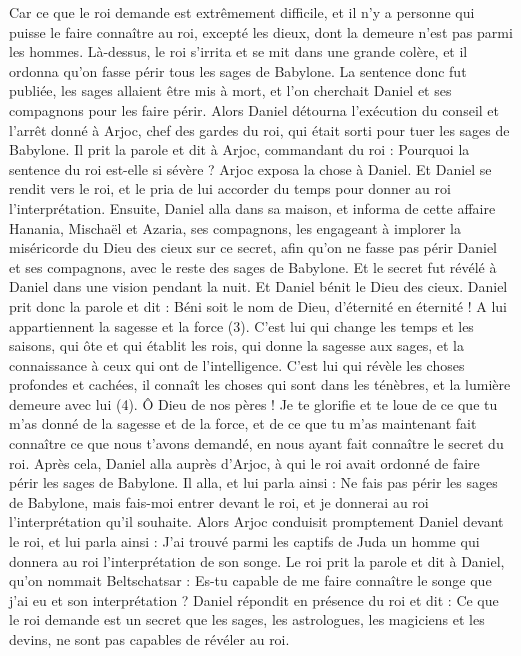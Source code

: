 \begin{multicols}{2}
Car ce que le roi demande est extrêmement difficile, et il n'y a personne qui puisse le faire connaître au roi, excepté les dieux, dont la demeure n’est pas parmi les hommes.
Là-dessus, le roi s’irrita et se mit dans une grande colère, et il ordonna qu’on fasse périr tous les sages de Babylone.
La sentence donc fut publiée, les sages allaient être mis à mort, et l’on cherchait Daniel et ses compagnons pour les faire périr.
Alors Daniel détourna l'exécution du conseil et l'arrêt donné à Arjoc, chef des gardes du roi, qui était sorti pour tuer les sages de Babylone.
Il prit la parole et dit à Arjoc, commandant du roi : Pourquoi la sentence du roi est-elle si sévère ? Arjoc exposa la chose à Daniel.
Et Daniel se rendit vers le roi, et le pria de lui accorder du temps pour donner au roi l'interprétation.
Ensuite, Daniel alla dans sa maison, et informa de cette affaire Hanania, Mischaël et Azaria, ses compagnons,
les engageant à implorer la miséricorde du Dieu des cieux sur ce secret, afin qu'on ne fasse pas périr Daniel et ses compagnons, avec le reste des sages de Babylone.
Et le secret fut révélé à Daniel dans une vision pendant la nuit. Et Daniel bénit le Dieu des cieux.
Daniel prit donc la parole et dit : Béni soit le nom de Dieu, d’éternité en éternité ! A lui appartiennent la sagesse et la force (3).
C’est lui qui change les temps et les saisons, qui ôte et qui établit les rois, qui donne la sagesse aux sages, et la connaissance à ceux qui ont de l'intelligence.
C'est lui qui révèle les choses profondes et cachées, il connaît les choses qui sont dans les ténèbres, et la lumière demeure avec lui (4).
Ô Dieu de nos pères ! Je te glorifie et te loue de ce que tu m'as donné de la sagesse et de la force, et de ce que tu m'as maintenant fait connaître ce que nous t'avons demandé, en nous ayant fait connaître le secret du roi.
Après cela, Daniel alla auprès d’Arjoc, à qui le roi avait ordonné de faire périr les sages de Babylone. Il alla, et lui parla ainsi : Ne fais pas périr les sages de Babylone, mais fais-moi entrer devant le roi, et je donnerai au roi l'interprétation qu'il souhaite.
Alors Arjoc conduisit promptement Daniel devant le roi, et lui parla ainsi : J'ai trouvé parmi les captifs de Juda un homme qui donnera au roi l'interprétation de son songe.
Le roi prit la parole et dit à Daniel, qu’on nommait Beltschatsar : Es-tu capable de me faire connaître le songe que j'ai eu et son interprétation ?
Daniel répondit en présence du roi et dit : Ce que le roi demande est un secret que les sages, les astrologues, les magiciens et les devins, ne sont pas capables de révéler au roi.

\end{multicols}
